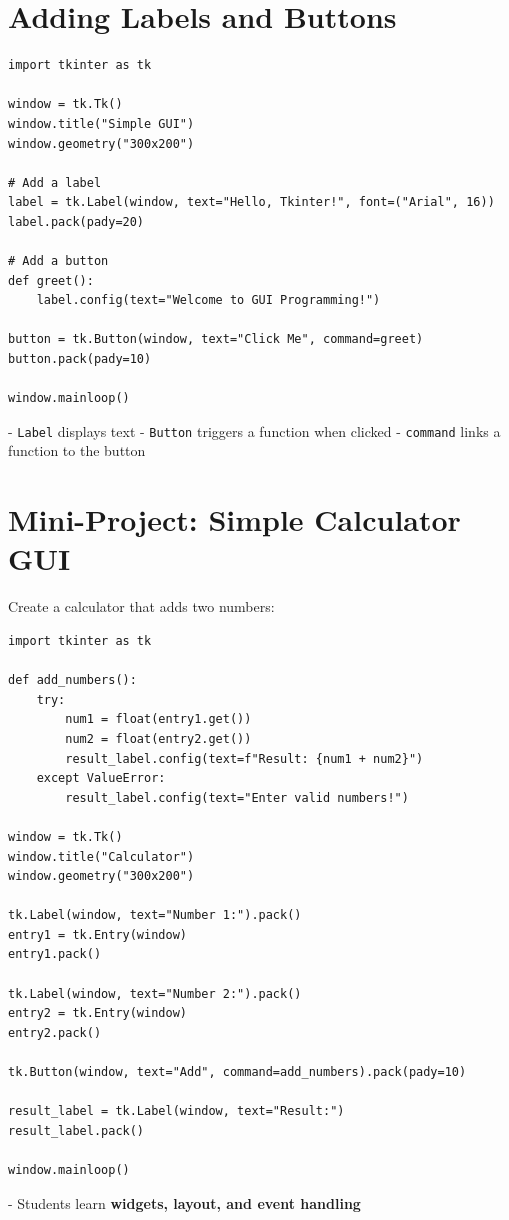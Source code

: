 \section{Adding Labels and Buttons}

\begin{verbatim}
import tkinter as tk

window = tk.Tk()
window.title("Simple GUI")
window.geometry("300x200")

# Add a label
label = tk.Label(window, text="Hello, Tkinter!", font=("Arial", 16))
label.pack(pady=20)

# Add a button
def greet():
    label.config(text="Welcome to GUI Programming!")

button = tk.Button(window, text="Click Me", command=greet)
button.pack(pady=10)

window.mainloop()
\end{verbatim}

- \texttt{Label} displays text  
- \texttt{Button} triggers a function when clicked  
- \texttt{command} links a function to the button  

\section{Mini-Project: Simple Calculator GUI}

Create a calculator that adds two numbers:

\begin{verbatim}
import tkinter as tk

def add_numbers():
    try:
        num1 = float(entry1.get())
        num2 = float(entry2.get())
        result_label.config(text=f"Result: {num1 + num2}")
    except ValueError:
        result_label.config(text="Enter valid numbers!")

window = tk.Tk()
window.title("Calculator")
window.geometry("300x200")

tk.Label(window, text="Number 1:").pack()
entry1 = tk.Entry(window)
entry1.pack()

tk.Label(window, text="Number 2:").pack()
entry2 = tk.Entry(window)
entry2.pack()

tk.Button(window, text="Add", command=add_numbers).pack(pady=10)

result_label = tk.Label(window, text="Result:")
result_label.pack()

window.mainloop()
\end{verbatim}

- Students learn \textbf{widgets, layout, and event handling}  

